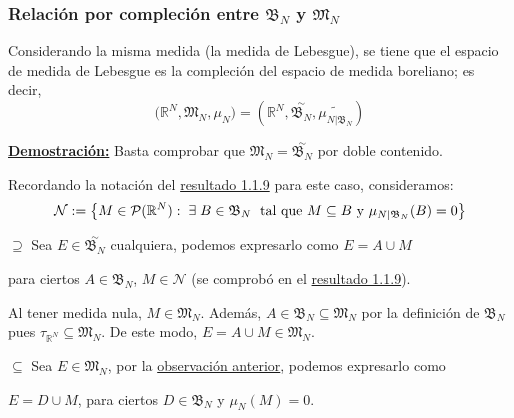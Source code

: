 \documentclass[12pt,a4paper]{article}
\newcommand{\R}{\mathbb{R}}
\newcounter{unit}[section]
\newcounter{chapter}[unit]
\renewcommand{\theunit}{\arabic{unit}}
\renewcommand{\thechapter}{\arabic{chapter}}
\renewcommand{\thesubsubsection}{\theunit.\thechapter.\arabic{subsubsection}}
\newcommand{\result}[1]{%
  \subsubsection{#1}%
  \label{result:\thesubsubsection}
}
\newcommand{\dem}{
    \noindent \underline{\textbf{Demostración:}}
}
\begin{document}
\newpage
\result{Relación por compleción entre \texorpdfstring{$\mathfrak{B}_N$}{B\_N} y \texorpdfstring{$\mathfrak{M}_N$}{M\_N}}
\hspace{3mm} Considerando la misma medida (la medida de Lebesgue), se tiene que el espacio de medida de Lebesgue es la compleción del espacio de medida boreliano; es decir,
$$\Big(\R^N, \mathfrak{M}_N, \mu_N\Big) = \left(\R^N, \overset{\sim}{\mathfrak{B}_N}, \widetilde{\mu_{N|\mathfrak{B}_N}}\right) $$

\dem Basta comprobar que $\mathfrak{M}_N = \overset{\sim}{\mathfrak{B}_N}$ por doble contenido.

\vspace{2mm} Recordando la notación del \hyperref[result:1.1.9]{resultado 1.1.9} para este caso, consideramos:
$$\mathcal{N} := \big\{M \in \mathcal{P}(\R^N) : \hspace{1mm} \exists \hspace{1mm} B \in \mathfrak{B}_N \hspace{1mm} \text{ tal que } M \subseteq B \text{  y } \mu_{N|\mathfrak{B}_N}(B) = 0 \big\}$$

\begin{tcolorbox}
    $\supseteq$ \hspace{3mm} Sea $E \in \overset{\sim}{\mathfrak{B}_N}$ cualquiera, podemos expresarlo como $E = A \cup M$
\end{tcolorbox} \vspace{-2ex}
para ciertos $A \in \mathfrak{B}_N$, $M \in \mathcal{N}$ (se comprobó en el \hyperref[result:1.1.9]{resultado 1.1.9}).

\vspace{2mm}
Al tener medida nula, $M \in \mathfrak{M}_N$. Además, $A \in \mathfrak{B}_N \subseteq \mathfrak{M}_N$ por la definición de $\mathfrak{B}_N$ pues $\tau_{\R^N} \subseteq \mathfrak{M}_N$. De este modo, $E = A \cup M \in \mathfrak{M}_N$.

\vspace{4mm}
\begin{tcolorbox}
    $\subseteq$ \hspace{3mm} Sea $E \in \mathfrak{M}_N$, por la \hyperref[result:1.2.17]{observación anterior}, podemos expresarlo como
\end{tcolorbox} \vspace{-2ex}
$E = D \cup M$, para ciertos $D \in \mathfrak{B}_N$ y $\mu_N(M) = 0$.
\end{document}
